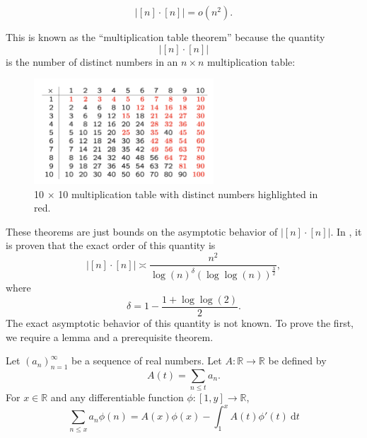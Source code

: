 \documentclass[12pt,reqno]{amsart}
\begin{document}
\begin{theorem*}
\[
    \left\lvert [n] \cdot [n] \right\rvert = o(n^{2})
.\]
\end{theorem*}

This is known as the ``multiplication table theorem'' because the quantity
\[
    \left\lvert [n] \cdot [n] \right\rvert 
\]
is the number of distinct numbers in an \(n \times n\) multiplication table:

\begin{figure}[h]
    \centering
    \includegraphics[width=0.6\textwidth]{mult-table.png}
    \caption{10 \(\times \) 10 multiplication table with distinct numbers highlighted in red.}
\end{figure}

These theorems are just bounds on the asymptotic behavior of \(\left\lvert [n] \cdot [n] \right\rvert \). 
In \cite{Ford}, it is proven that the exact order of this quantity is
\[
    \left\lvert [n] \cdot [n] \right\rvert \asymp \frac{n^{2}}{\log \left( n \right) ^{\delta} \left( \log \log \left( n \right) \right) ^{\frac{3}{2} } } 
,\]
where
\[
    \delta = 1 - \frac{1 + \log \log \left( 2 \right)  }{2} 
.\]
The exact asymptotic behavior of this quantity is not known.
To prove the first, we require a lemma and a prerequisite theorem.

\begin{lemma*}
Let \(\left( a_{n}  \right) _{n = 1} ^{\infty }\) be a sequence of real numbers. Let \(A: \mathbb{R} \to \mathbb{R} \) be defined by
\[
    A(t) = \sum _{n \leq t} a_{n} 
.\]
For \(x \in \mathbb{R} \) and any differentiable function \(\phi : [1,y] \to \mathbb{R} \),
\[
    \sum _{n \leq x} a_{n} \phi(n) = A(x)\phi(x) - \int_{1}^{x} A(t)\phi'(t) ~\mathrm{d} t
\]
\end{lemma*}
\end{document}
